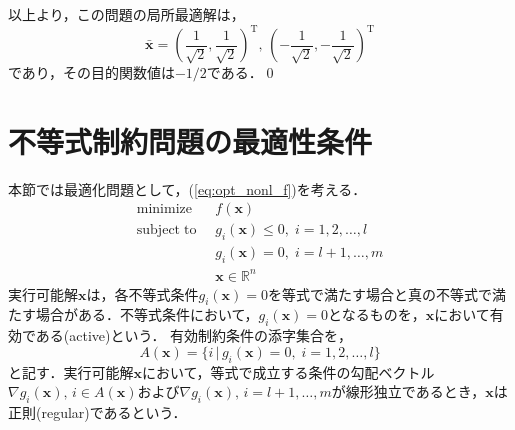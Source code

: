 \documentclass{jsreport}
\begin{document}
以上より，この問題の局所最適解は，
\begin{equation}
  \bar{\bm{x}} = \left(\frac{1}{\sqrt{2}}, \frac{1}{\sqrt{2}}\right)^{\mathrm{T}}, \, \left(- \frac{1}{\sqrt{2}}, - \frac{1}{\sqrt{2}}\right)^{\mathrm{T}} \nonumber
\end{equation}
であり，その目的関数値は$-1/2$である．\qed

\section{不等式制約問題の最適性条件}
本節では最適化問題として，(\ref{eq:opt_nonl_f})を考える．
\begin{align}\label{eq:opt_nonl_f}
  \mathrm{minimize} \; \; &f(\bm{x}) \nonumber\\
  \mathrm{subject \; to} \; \; &g_i(\bm{x}) \leq 0, \; i = 1, 2, \ldots, l \nonumber \\
  &g_i(\bm{x}) = 0, \; i = l+1, \ldots, m \nonumber \\
  &\bm{x} \in \mathbb{R}^n
\end{align}
実行可能解$\bm{x}$は，各不等式条件$g_i(\bm{x}) = 0$を等式で満たす場合と真の不等式で満たす場合がある．不等式条件において，$g_i(\bm{x}) = 0$となるものを，$\bm{x}$において有効である(active)という．
有効制約条件の添字集合を，
\begin{equation}\label{eq:activesubscript}
  A(\bm{x}) = \{i \, | \, g_i(\bm{x}) = 0, \; i = 1, 2, \ldots, l\}
\end{equation}
と記す．実行可能解$\bm{x}$において，等式で成立する条件の勾配ベクトル$\nabla g_i(\bm{x}), \, i \in A(\bm{x})$および$\nabla g_i(\bm{x}), \, i = l + 1, \ldots, m$が線形独立であるとき，$\bm{x}$は正則(regular)であるという．
\end{document}
